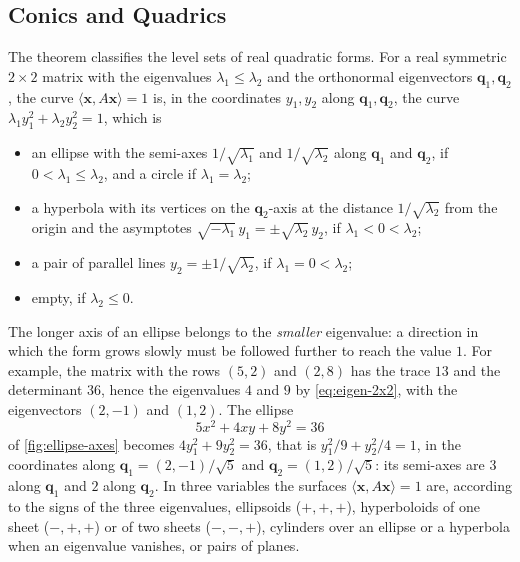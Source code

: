 \subsection{Conics and Quadrics}

The theorem classifies the level sets of real quadratic forms. For a real symmetric $2\times2$ matrix with the eigenvalues $\lambda_1\le\lambda_2$ and the orthonormal eigenvectors $\mathbf q_1,\mathbf q_2$, the curve $\langle\mathbf x,A\mathbf x\rangle=1$ is, in the coordinates $y_1,y_2$ along $\mathbf q_1,\mathbf q_2$, the curve $\lambda_1y_1^2+\lambda_2y_2^2=1$, which is
\begin{itemize}
\item an ellipse with the semi-axes $1/\sqrt{\lambda_1}$ and $1/\sqrt{\lambda_2}$ along $\mathbf q_1$ and $\mathbf q_2$, if $0<\lambda_1\le\lambda_2$, and a circle if $\lambda_1=\lambda_2$;
\item a hyperbola with its vertices on the $\mathbf q_2$-axis at the distance $1/\sqrt{\lambda_2}$ from the origin and the asymptotes $\sqrt{-\lambda_1}\,y_1=\pm\sqrt{\lambda_2}\,y_2$, if $\lambda_1<0<\lambda_2$;
\item a pair of parallel lines $y_2=\pm1/\sqrt{\lambda_2}$, if $\lambda_1=0<\lambda_2$;
\item empty, if $\lambda_2\le0$.
\end{itemize}
The longer axis of an ellipse belongs to the \emph{smaller} eigenvalue: a direction in which the form grows slowly must be followed further to reach the value $1$. For example, the matrix with the rows $(5,2)$ and $(2,8)$ has the trace $13$ and the determinant $36$, hence the eigenvalues $4$ and $9$ by \eqref{eq:eigen-2x2}, with the eigenvectors $(2,-1)$ and $(1,2)$. The ellipse
\[
5x^2+4xy+8y^2=36
\]
of \cref{fig:ellipse-axes} becomes $4y_1^2+9y_2^2=36$, that is $y_1^2/9+y_2^2/4=1$, in the coordinates along $\mathbf q_1=(2,-1)/\sqrt5$ and $\mathbf q_2=(1,2)/\sqrt5$: its semi-axes are $3$ along $\mathbf q_1$ and $2$ along $\mathbf q_2$. In three variables the surfaces $\langle\mathbf x,A\mathbf x\rangle=1$ are, according to the signs of the three eigenvalues, ellipsoids ($+,+,+$), hyperboloids of one sheet ($-,+,+$) or of two sheets ($-,-,+$), cylinders over an ellipse or a hyperbola when an eigenvalue vanishes, or pairs of planes.

